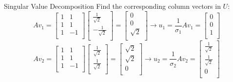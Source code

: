 \documentclass{beamer}
\begin{document}
\begin{frame}{Singular Value Decomposition}
    Find the corresponding column vectors in $U$:
\begin{equation*}
    Av_1=\left[ \begin{matrix}
        1&		1\\
        1&		1\\
        1&		-1\\
    \end{matrix} \right] \left[ \begin{array}{c}
        \frac{1}{\sqrt{2}}\\
        -\frac{1}{\sqrt{2}}\\
    \end{array} \right] =\left[ \begin{array}{c}
        0\\
        0\\
        \sqrt{2}\\
    \end{array} \right] \rightarrow u_1=\frac{1}{\sigma _1}Av_1=\left[ \begin{array}{c}
        0\\
        0\\
        1\\
    \end{array} \right]
\end{equation*}
\begin{equation*}
    Av_2=\left[ \begin{matrix}
        1&		1\\
        1&		1\\
        1&		-1\\
    \end{matrix} \right] \left[ \begin{array}{c}
        \frac{1}{\sqrt{2}}\\
        \frac{1}{\sqrt{2}}\\
    \end{array} \right] =\left[ \begin{array}{c}
        \sqrt{2}\\
        \sqrt{2}\\
        0\\
    \end{array} \right] \rightarrow u_2=\frac{1}{\sigma _2}Av_2=\left[ \begin{array}{c}
        \frac{1}{\sqrt{2}}\\
        \frac{1}{\sqrt{2}}\\
        0\\
    \end{array} \right]
\end{equation*}


\end{frame}
\end{document}
